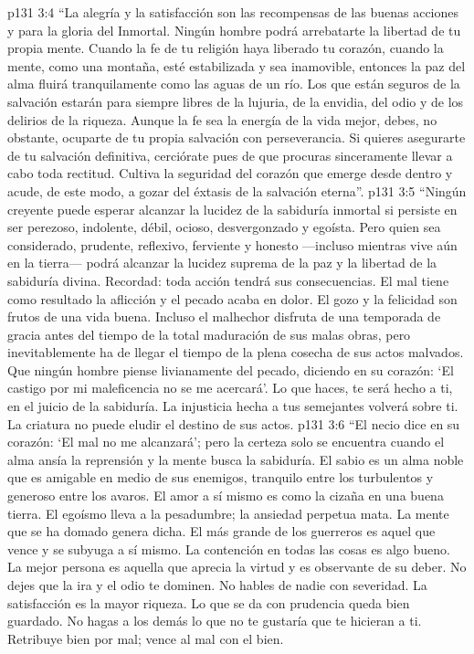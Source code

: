 \vs p131 3:4 “La alegría y la satisfacción son las recompensas de las buenas acciones y para la gloria del Inmortal. Ningún hombre podrá arrebatarte la libertad de tu propia mente. Cuando la fe de tu religión haya liberado tu corazón, cuando la mente, como una montaña, esté estabilizada y sea inamovible, entonces la paz del alma fluirá tranquilamente como las aguas de un río. Los que están seguros de la salvación estarán para siempre libres de la lujuria, de la envidia, del odio y de los delirios de la riqueza. Aunque la fe sea la energía de la vida mejor, debes, no obstante, ocuparte de tu propia salvación con perseverancia. Si quieres asegurarte de tu salvación definitiva, cerciórate pues de que procuras sinceramente llevar a cabo toda rectitud. Cultiva la seguridad del corazón que emerge desde dentro y acude, de este modo, a gozar del éxtasis de la salvación eterna”.
\vs p131 3:5 “Ningún creyente puede esperar alcanzar la lucidez de la sabiduría inmortal si persiste en ser perezoso, indolente, débil, ocioso, desvergonzado y egoísta. Pero quien sea considerado, prudente, reflexivo, ferviente y honesto ---incluso mientras vive aún en la tierra--- podrá alcanzar la lucidez suprema de la paz y la libertad de la sabiduría divina. Recordad: toda acción tendrá sus consecuencias. El mal tiene como resultado la aflicción y el pecado acaba en dolor. El gozo y la felicidad son frutos de una vida buena. Incluso el malhechor disfruta de una temporada de gracia antes del tiempo de la total maduración de sus malas obras, pero inevitablemente ha de llegar el tiempo de la plena cosecha de sus actos malvados. Que ningún hombre piense livianamente del pecado, diciendo en su corazón: ‘El castigo por mi maleficencia no se me acercará'. Lo que haces, te será hecho a ti, en el juicio de la sabiduría. La injusticia hecha a tus semejantes volverá sobre ti. La criatura no puede eludir el destino de sus actos.
\vs p131 3:6 “El necio dice en su corazón: ‘El mal no me alcanzará'; pero la certeza solo se encuentra cuando el alma ansía la reprensión y la mente busca la sabiduría. El sabio es un alma noble que es amigable en medio de sus enemigos, tranquilo entre los turbulentos y generoso entre los avaros. El amor a sí mismo es como la cizaña en una buena tierra. El egoísmo lleva a la pesadumbre; la ansiedad perpetua mata. La mente que se ha domado genera dicha. El más grande de los guerreros es aquel que vence y se subyuga a sí mismo. La contención en todas las cosas es algo bueno. La mejor persona es aquella que aprecia la virtud y es observante de su deber. No dejes que la ira y el odio te dominen. No hables de nadie con severidad. La satisfacción es la mayor riqueza. Lo que se da con prudencia queda bien guardado. No hagas a los demás lo que no te gustaría que te hicieran a ti. Retribuye bien por mal; vence al mal con el bien.

